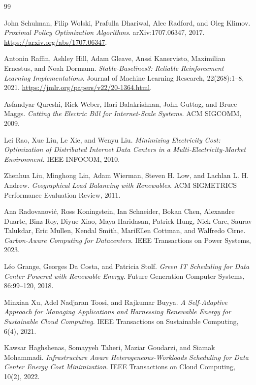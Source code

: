 ﻿\documentclass[12pt]{article}
\begin{document}
\begin{thebibliography}{99}
\raggedright

John Schulman, Filip Wolski, Prafulla Dhariwal, Alec Radford, and Oleg Klimov.
\newblock \emph{Proximal Policy Optimization Algorithms}.
\newblock arXiv:1707.06347, 2017.
\newblock \url{https://arxiv.org/abs/1707.06347}.

Antonin Raffin, Ashley Hill, Adam Gleave, Anssi Kanervisto, Maximilian
Ernestus, and Noah Dormann.
\newblock \emph{Stable-Baselines3: Reliable Reinforcement Learning
Implementations}.
\newblock Journal of Machine Learning Research, 22(268):1--8, 2021.
\newblock \url{https://jmlr.org/papers/v22/20-1364.html}.

Asfandyar Qureshi, Rick Weber, Hari Balakrishnan, John Guttag, and Bruce Maggs.
\newblock \emph{Cutting the Electric Bill for Internet-Scale Systems}.
\newblock ACM SIGCOMM, 2009.

Lei Rao, Xue Liu, Le Xie, and Wenyu Liu.
\newblock \emph{Minimizing Electricity Cost: Optimization of Distributed
Internet Data Centers in a Multi-Electricity-Market Environment}.
\newblock IEEE INFOCOM, 2010.

Zhenhua Liu, Minghong Lin, Adam Wierman, Steven H. Low, and Lachlan L. H.
Andrew.
\newblock \emph{Geographical Load Balancing with Renewables}.
\newblock ACM SIGMETRICS Performance Evaluation Review, 2011.

Ana Radovanovi\'{c}, Ross Koningstein, Ian Schneider, Bokan Chen, Alexandre
Duarte, Binz Roy, Diyue Xiao, Maya Haridasan, Patrick Hung, Nick Care, Saurav
Talukdar, Eric Mullen, Kendal Smith, MariEllen Cottman, and Walfredo Cirne.
\newblock \emph{Carbon-Aware Computing for Datacenters}.
\newblock IEEE Transactions on Power Systems, 2023.

L\'{e}o Grange, Georges Da Costa, and Patricia Stolf.
\newblock \emph{Green IT Scheduling for Data Center Powered with Renewable
Energy}.
\newblock Future Generation Computer Systems, 86:99--120, 2018.

Minxian Xu, Adel Nadjaran Toosi, and Rajkumar Buyya.
\newblock \emph{A Self-Adaptive Approach for Managing Applications and
Harnessing Renewable Energy for Sustainable Cloud Computing}.
\newblock IEEE Transactions on Sustainable Computing, 6(4), 2021.

Kawsar Haghshenas, Somayyeh Taheri, Maziar Goudarzi, and Siamak Mohammadi.
\newblock \emph{Infrastructure Aware Heterogeneous-Workloads Scheduling for
Data Center Energy Cost Minimization}.
\newblock IEEE Transactions on Cloud Computing, 10(2), 2022.


\end{thebibliography}
\end{document}

